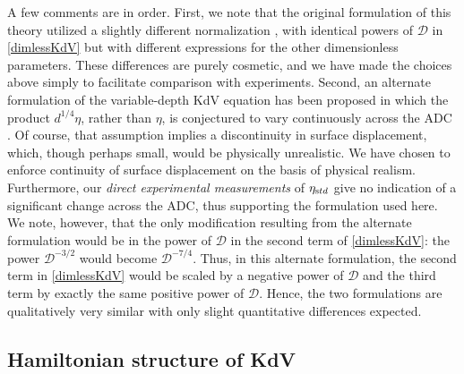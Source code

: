 \documentclass[11pt]{article}
\newcommand{\etastd}{\eta_{\text std}}
\newcommand{\depth}{d}
\newcommand{\drat}{\mathcal{D}}
\begin{document}
A few comments are in order. First, we note that the original formulation of this theory utilized a slightly different normalization \cite{majda2019}, with identical powers of $\drat$ in \eqref{dimlessKdV} but with different expressions for the other dimensionless parameters. These differences are purely cosmetic, and we have made the choices above simply to facilitate comparison with experiments. Second, an alternate formulation of the variable-depth KdV equation has been proposed in which the product $\depth^{1/4} \eta$, rather than $\eta$, is conjectured to vary continuously across the ADC \cite{johnson1997modern}. Of course, that assumption implies a discontinuity in surface displacement, which, though perhaps small, would be physically unrealistic. We have chosen to enforce continuity of surface displacement on the basis of physical realism. Furthermore, our {\em direct experimental measurements} of $\etastd$ give no indication of a significant change across the ADC, thus supporting the formulation used here. We note, however, that the only modification resulting from the alternate formulation would be in the power of $\drat$ in the second term of \eqref{dimlessKdV}: the power $\drat^{-3/2}$ would become $\drat^{-7/4}$. Thus, in this alternate formulation, the second term in \eqref{dimlessKdV} would be scaled by a negative power of $\drat$ and the third term by exactly the same positive power of $\drat$. Hence, the two formulations are qualitatively very similar with only slight quantitative differences expected. 
 

\subsection{Hamiltonian structure of KdV}
\label{HamiltonianSection}
\end{document}
